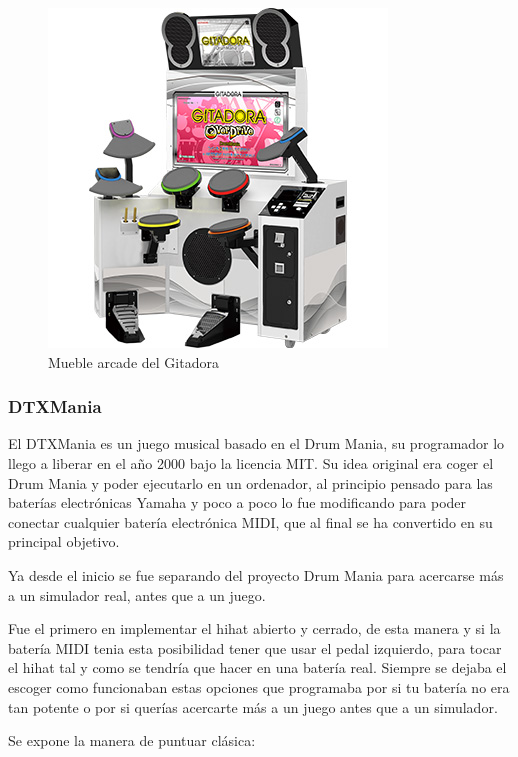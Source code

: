 \documentclass[a4paper,11pt,oneside]{book}
\begin{document}
\begin{figure}[H]
\begin{center}
\includegraphics[scale=0.5]{Imagenes/cabinet-gitadora.jpg}
\caption{Mueble arcade del Gitadora}
\label{Mueble arcade del Gitadora}
\end{center}
\end{figure}


\subsubsection{DTXMania}
El DTXMania es un juego musical basado en el Drum Mania, su programador lo llego a liberar en el año 2000 bajo la licencia MIT. Su idea original era coger el Drum Mania y poder ejecutarlo en un ordenador, al principio pensado para las baterías electrónicas Yamaha y poco a poco lo fue modificando para poder conectar cualquier batería electrónica MIDI, que al final se ha convertido en su principal objetivo.

Ya desde el inicio se fue separando del proyecto Drum Mania para acercarse más a un simulador real, antes que a un juego.

Fue el primero en implementar el hihat abierto y cerrado, de esta manera y si la batería MIDI tenia esta posibilidad tener que usar el pedal izquierdo, para tocar el hihat tal y como se tendría que hacer en una batería real. Siempre se dejaba el escoger como funcionaban estas opciones que programaba por si tu batería no era tan potente o por si querías acercarte más a un juego antes que a un simulador.

Se expone la manera de puntuar clásica:
\end{document}
